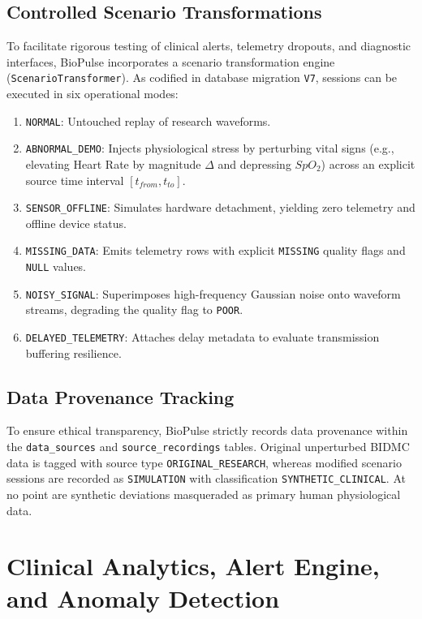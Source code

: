 \documentclass[10pt,journal,compsoc]{IEEEtran}
\begin{document}
\subsection{Controlled Scenario Transformations}
To facilitate rigorous testing of clinical alerts, telemetry dropouts, and diagnostic interfaces, BioPulse incorporates a scenario transformation engine (\texttt{ScenarioTransformer}). As codified in database migration \texttt{V7}, sessions can be executed in six operational modes:
\begin{enumerate}
    \item \texttt{NORMAL}: Untouched replay of research waveforms.
    \item \texttt{ABNORMAL\_DEMO}: Injects physiological stress by perturbing vital signs (e.g., elevating Heart Rate by magnitude $\Delta$ and depressing $SpO_2$) across an explicit source time interval $[t_{from}, t_{to}]$.
    \item \texttt{SENSOR\_OFFLINE}: Simulates hardware detachment, yielding zero telemetry and offline device status.
    \item \texttt{MISSING\_DATA}: Emits telemetry rows with explicit \texttt{MISSING} quality flags and \texttt{NULL} values.
    \item \texttt{NOISY\_SIGNAL}: Superimposes high-frequency Gaussian noise onto waveform streams, degrading the quality flag to \texttt{POOR}.
    \item \texttt{DELAYED\_TELEMETRY}: Attaches delay metadata to evaluate transmission buffering resilience.
\end{enumerate}

\subsection{Data Provenance Tracking}
To ensure ethical transparency, BioPulse strictly records data provenance within the \texttt{data\_sources} and \texttt{source\_recordings} tables. Original unperturbed BIDMC data is tagged with source type \texttt{ORIGINAL\_RESEARCH}, whereas modified scenario sessions are recorded as \texttt{SIMULATION} with classification \texttt{SYNTHETIC\_CLINICAL}. At no point are synthetic deviations masqueraded as primary human physiological data.

\section{Clinical Analytics, Alert Engine, and Anomaly Detection}
\label{sec:analytics}
\end{document}
